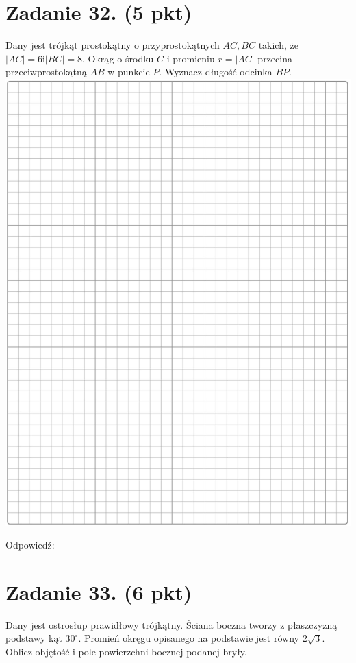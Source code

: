 \documentclass[10pt]{article}
\begin{document}
\section*{Zadanie 32. (5 pkt)}
Dany jest trójkąt prostokątny o przyprostokątnych \(A C, B C\) takich, że \(|A C|=6 \mathrm{i}|B C|=8\). Okrąg o środku \(C\) i promieniu \(r=|A C|\) przecina przeciwprostokątną \(A B\) w punkcie \(P\). Wyznacz długość odcinka \(B P\).\\
\includegraphics[max width=\textwidth, center]{2024_11_21_fd9e49107d1ddcec5cd8g-11}

Odpowiedź:

\section*{Zadanie 33. (6 pkt)}
Dany jest ostrosłup prawidłowy trójkątny. Ściana boczna tworzy z płaszczyzną podstawy kąt \(30^{\circ}\). Promień okręgu opisanego na podstawie jest równy \(2 \sqrt{3}\). Oblicz objętość i pole powierzchni bocznej podanej bryły.
\end{document}
